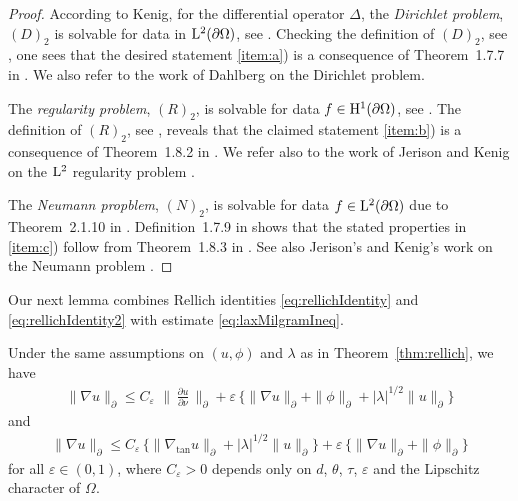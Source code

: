 \begin{proof}
  According to Kenig, for the differential operator $\Delta$, the \emph{Dirichlet problem}, $(D)_2$ is solvable for data in $\mathrm{L}^2(\partial\Omega)$, see \cite[Thm.\@~2.1.5]{kenigBook}.
  Checking the definition of $(D)_2$, see \cite[Defn.\@~1.7.4]{kenigBook}, one sees that the desired statement \ref{item:a}) is a consequence of Theorem~1.7.7 in \cite{kenigBook}.
  We also refer to the work of Dahlberg \cite{dahlberg} on the Dirichlet problem.

  The \emph{regularity problem}, $(R)_2$, is solvable for data $f \in \mathrm{H}^1(\partial\Omega)$, see \cite[Thm.\@~2.1.10]{kenigBook}.
  The definition of $(R)_2$, see \cite[Defn.\@~1.7.4]{kenigBook}, reveals that the claimed statement \ref{item:b}) is a consequence of Theorem~1.8.2 in \cite{kenigBook}. 
  We refer also to the work of Jerison and Kenig on the $\mathrm{L}^2$ regularity problem \cite{jerisonKenig2}.

  The \emph{Neumann propblem}, $(N)_2$, is solvable for data $f \in \mathrm{L}^2(\partial\Omega)$ due to Theorem~2.1.10 in \cite{kenigBook}.
  Definition~1.7.9 in \cite{kenigBook} shows that the stated properties in \ref{item:c}) follow from Theorem~1.8.3 in \cite{kenigBook}.
  See also Jerison's and Kenig's work on the Neumann problem \cite{jerisonKenig}.
\end{proof}

Our next lemma combines Rellich identities \eqref{eq:rellichIdentity} and \eqref{eq:rellichIdentity2} with estimate \eqref{eq:laxMilgramIneq}.

\begin{lem}
  Under the same assumptions on $(u,\phi)$ and $\lambda$ as in Theorem~\ref{thm:rellich}, we have
  \begin{align}
    \label{eq:gradEstimateRellich}
    \| \nabla u\|^{}_\partial \leq C_\varepsilon\, \,\Big\|\, \frac{\partial u}{\partial \nu} \, \Big\|^{}_\partial + \varepsilon \,\Big\{ \|\nabla u\|^{}_\partial + \|\phi\|^{}_\partial +  |\lambda|^{1/2} \| u\|^{}_\partial \Big\}
  \end{align}
  and
  \begin{align}
    \label{eq:gradEstimateRellich2}
    \|\nabla u\|^{}_\partial \leq C_\varepsilon\, \Big\{ \big\|\nabla_{\mathrm{tan}} u \big\|^{}_\partial + |\lambda|^{1/2} \| u\|^{}_\partial \Big\} + \varepsilon\, \Big\{ \|\nabla u\|^{}_\partial + \|\phi\|^{}_\partial \Big\}
  \end{align}
  for all $\varepsilon \in (0,1)$, where $C_\varepsilon > 0$ depends only on $d$, $\theta$, $\tau$, $\varepsilon$ and the Lipschitz character of $\Omega$.
\end{lem}

